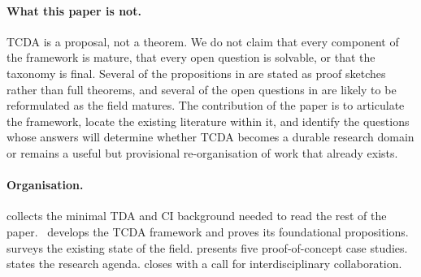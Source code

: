 \paragraph{What this paper is not.}
TCDA is a proposal, not a theorem. We do not claim that every
component of the framework is mature, that every open question is
solvable, or that the taxonomy is final. Several of the propositions
in  are stated as proof sketches
rather than full theorems, and several of the open questions in
 are likely to be reformulated as the field
matures. The contribution of the paper is to articulate the
framework, locate the existing literature within it, and identify
the questions whose answers will determine whether TCDA becomes a
durable research domain or remains a useful but provisional
re-organisation of work that already exists.

\paragraph{Organisation.}
 collects the minimal TDA and CI background
needed to read the rest of the paper.
~develops the TCDA framework and proves its
foundational propositions.  surveys the existing
state of the field.  presents five
proof-of-concept case studies.  states the
research agenda.  closes with a call for
interdisciplinary collaboration.
